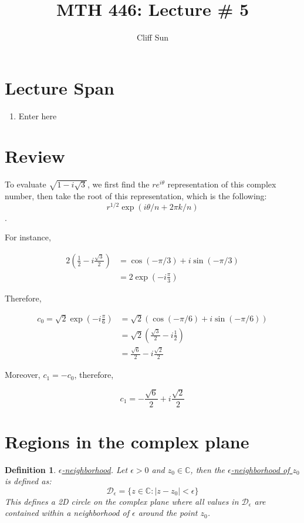 \documentclass{article}
\title{MTH 446: Lecture \# 5}
\author{Cliff Sun}
\newtheorem{definition}[theorem]{Definition}
\newtheorem{one minute paper}[theorem]{One Minute Paper}
\begin{document}
\maketitle

\section*{Lecture Span}
\begin{enumerate}
    \item Enter here
\end{enumerate}

\section*{Review}

To evaluate $\sqrt{1 - i\sqrt{3}}$, we first find the $re^{i\theta}$ representation of this complex number, then take the root of this representation, which is the following: $$r^{1/2}\exp(i\theta/n + 2\pi k/n)$$. 

For instance, 

\begin{align}
    2\left( \frac{1}{2} - i\frac{\sqrt{3}}{2} \right) &= \cos\left( -\pi/3 \right) + i\sin(-\pi/3) \\
    &= 2\exp(-i\frac{\pi}{3})
\end{align}

Therefore, 

\begin{align}
    c_0 = \sqrt{2}\exp(-i\frac{\pi}{6}) &= \sqrt{2}\left( \cos(-\pi/6) + i\sin(-\pi/6) \right) \\
    &= \sqrt{2}\left( \frac{\sqrt{3}}{2} - i\frac{1}{2} \right)\\
    &= \frac{\sqrt{6}}{2} - i\frac{\sqrt{2}}{2}
\end{align}

Moreover, $c_1 = -c_0$, therefore, 

\begin{equation}
    c_1 = -\frac{\sqrt{6}}{2} + i\frac{\sqrt{2}}{2}
\end{equation}

\section*{Regions in the complex plane}

\begin{definition}
    \underline{$\epsilon$-neighborhood}. Let $\epsilon > 0$ and $z_0 \in \mathbb{C}$, then the \underline{$\epsilon$-neighborhood of $z_0$} is defined as:
    \begin{equation}
        \mathcal{D}_{\epsilon} = \{z \in \mathbb{C}: |z - z_0| < \epsilon\}
    \end{equation}
    This defines a 2D circle on the complex plane where all values in $\mathcal{D}_{\epsilon}$ are contained within a neighborhood of $\epsilon$ around the point $z_0$. 
\end{definition}
\end{document}
